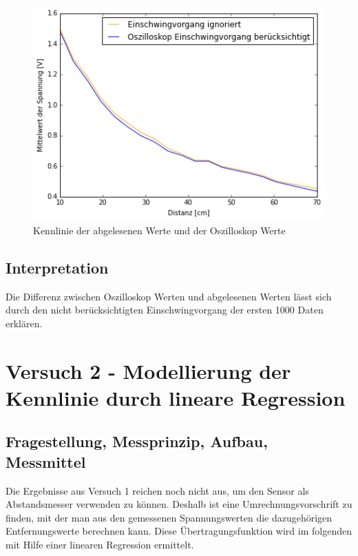 \documentclass[12pt,oneside,a4paper]{report}
\begin{document}
\begin{figure}[H]
	\centering\small
	\includegraphics[width=\textwidth]{src/Diagramm1.png}
	\caption{Kennlinie der abgelesenen Werte und der Oszilloskop Werte}
	\label{fig:Diagramm1}
\end{figure}	

\section{Interpretation}
\label{chap:VERSUCH_1_INTERPRETATION}
Die Differenz zwischen Oszilloskop Werten und abgelesenen Werten lässt sich durch den nicht berücksichtigten Einschwingvorgang der ersten 1000 Daten erklären.


%
%
\chapter{Versuch 2 - Modellierung der Kennlinie durch lineare Regression}
\label{chap:VERSUCH_2}


\section{Fragestellung, Messprinzip, Aufbau, Messmittel}
\label{chap:VERSUCH_2_FRAGESTELLUNG}

Die Ergebnisse aus Versuch 1 reichen noch nicht aus, um den Sensor als Abstandsmesser verwenden zu können. Deshalb ist eine Umrechnungsvorschrift zu finden, mit der man aus den gemessenen Spannungswerten die dazugehörigen Entfernungswerte berechnen kann.
Diese Übertragungsfunktion wird im folgenden mit Hilfe einer linearen Regression ermittelt.
\end{document}
